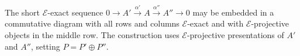 The short $\mathcal{E}$-exact sequence $0 \to A' \xrightarrow{\alpha'} A \xrightarrow{\alpha''} A'' \to 0$ may be embedded in a commutative diagram with all rows and columns $\mathcal{E}$-exact and with $\mathcal{E}$-projective objects in the middle row. The construction uses $\mathcal{E}$-projective presentations of $A'$ and $A''$, setting $P = P' \oplus P''$.